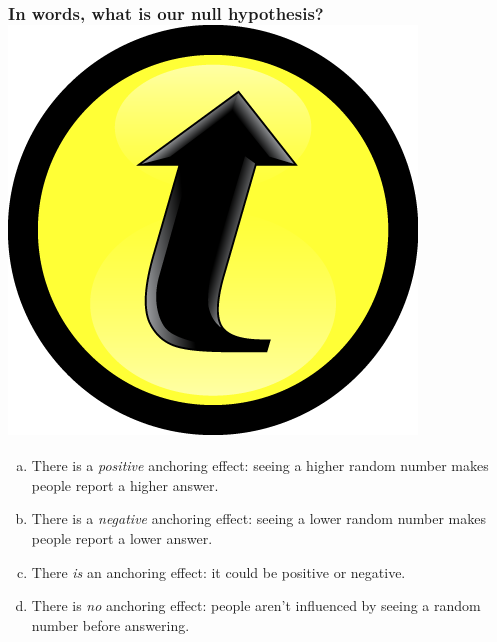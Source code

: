 \documentclass[handout]{beamer}
\begin{document}
\begin{frame}
	\frametitle{In words, what is our null hypothesis?\hfill \includegraphics[scale = 0.05]{./images/clicker}}

	\begin{enumerate}[(a)]
		\item There is a \emph{positive} anchoring effect: seeing a higher random number makes people report a higher answer.
		\item There is a \emph{negative} anchoring effect: seeing a lower random number makes people report a lower answer. 
		\item There \emph{is} an anchoring effect: it could be positive or negative.
		\item There is  \emph{no} anchoring effect: people aren't influenced by seeing a random number before answering.
	\end{enumerate}
\end{frame}
\end{document}
